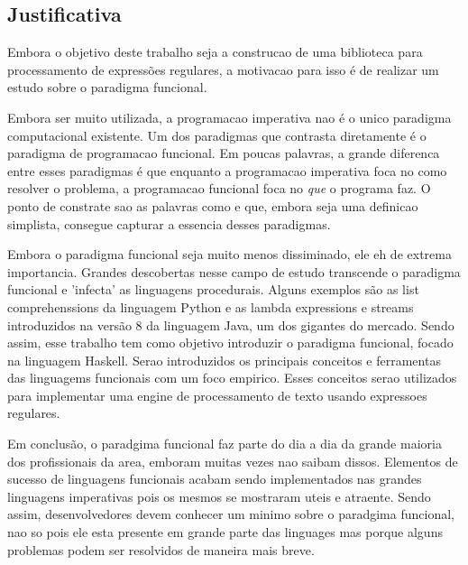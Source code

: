 \subsection{Justificativa}
Embora o objetivo deste trabalho seja a construcao de uma biblioteca para processamento de expressões regulares, a motivacao para isso é de realizar um estudo sobre o paradigma funcional.

Embora ser muito utilizada, a programacao imperativa nao é o unico paradigma computacional existente.
Um dos paradigmas que contrasta diretamente é o paradigma de programacao funcional.
Em poucas palavras, a grande diferenca entre esses paradigmas é que enquanto a programacao imperativa foca no como resolver o problema, a programacao funcional foca no \emph{que} o programa faz.
O ponto de constrate sao as palavras como e que, embora seja uma definicao simplista, consegue capturar a essencia desses paradigmas.

Embora o paradigma funcional seja muito menos dissiminado, ele eh de extrema importancia.
Grandes descobertas nesse campo de estudo transcende o paradigma funcional e 'infecta' as linguagens procedurais.
Alguns exemplos são as list comprehenssions da linguagem Python e as lambda expressions e streams introduzidos na versão 8 da linguagem Java, um dos gigantes do mercado.
Sendo assim, esse trabalho tem como objetivo introduzir o paradigma funcional, focado na linguagem Haskell.
Serao introduzidos os principais conceitos e ferramentas das linguagems funcionais com um foco empirico.
Esses conceitos serao utilizados para implementar uma engine de processamento de texto usando expressoes regulares.

Em conclusão, o paradgima funcional faz parte do dia a dia da grande maioria dos profissionais da area, emboram muitas vezes nao saibam dissos.
Elementos de sucesso de linguagens funcionais acabam sendo implementados nas grandes linguagens imperativas pois os mesmos se mostraram uteis e atraente.
Sendo assim, desenvolvedores devem conhecer um minimo sobre o paradgima funcional, nao so pois ele esta presente em grande parte das linguages mas porque alguns problemas podem ser resolvidos de maneira mais breve.
